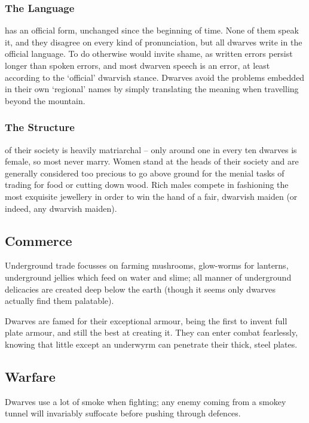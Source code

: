 \begin{multicols}{2}
\subsubsection{The Language}
has an official form, unchanged since the beginning of time.
None of them speak it, and they disagree on every kind of pronunciation, but all dwarves write in the official language.
To do otherwise would invite shame, as written errors persist longer than spoken errors, and most dwarven speech is an error, at least according to the `official' dwarvish stance.
Dwarves avoid the problems embedded in their own `regional' names by simply translating the meaning when travelling beyond the mountain.

\subsubsection{The Structure}
\label{dwarven_structure}
of their society is heavily matriarchal -- only around one in every ten dwarves is female, so most never marry.
Women stand at the heads of their society and are generally considered too precious to go above ground for the menial tasks of trading for food or cutting down wood.
Rich males compete in fashioning the most exquisite jewellery in order to win the hand of a fair, dwarvish maiden (or indeed, any dwarvish maiden).

\subsection{Commerce}

Underground trade focusses on farming mushrooms, glow-worms for lanterns, underground jellies which feed on water and slime; all manner of underground delicacies are created deep below the earth (though it seems only dwarves actually find them palatable).

Dwarves are famed for their exceptional armour, being the first to invent full plate armour, and still the best at creating it.
They can enter combat fearlessly, knowing that little except an underwyrm can penetrate their thick, steel plates.

\subsection{Warfare}

Dwarves use a lot of smoke when fighting; any enemy coming from a smokey tunnel will invariably suffocate before pushing through defences.


\end{multicols}
